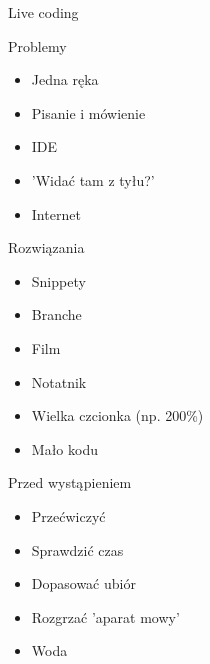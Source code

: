 \documentclass{beamer}
\begin{document}
\begin{frame}{}
	\begin{center}
		\Huge{Live coding}
	\end{center}
\end{frame}

\begin{frame}{}
	\begin{center}
		\Huge{Problemy}
	\end{center}
\end{frame}

\begin{frame}{}
	\begin{Large}
		\begin{itemize}
			\item Jedna ręka
			\item Pisanie i mówienie
			\item IDE
			\item 'Widać tam z tyłu?'
			\item Internet
		\end{itemize}
	\end{Large}
\end{frame}

\begin{frame}{}
	\begin{center}
		\Huge{Rozwiązania}
	\end{center}
\end{frame}

\begin{frame}{}
	\begin{Large}
		\begin{itemize}
			\item Snippety
			\item Branche
			\item Film
			\item Notatnik
			\item Wielka czcionka (np. 200\%)
			\item Mało kodu
		\end{itemize}
	\end{Large}
\end{frame}

\begin{frame}{}
	\begin{center}
		\Huge{Przed wystąpieniem}
	\end{center}
\end{frame}

\begin{frame}{}
	\begin{Large}
		\begin{itemize}
			\item Przećwiczyć
			\item Sprawdzić czas
			\item Dopasować ubiór
			\item Rozgrzać 'aparat mowy'
			\item Woda
		\end{itemize}
	\end{Large}
\end{frame}
\end{document}

